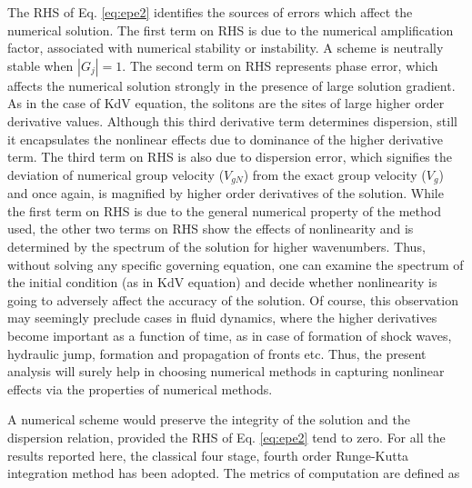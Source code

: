 The RHS of Eq. \eqref{eq:epe2} identifies the sources of errors which affect the numerical solution. The first term on RHS is due to the numerical amplification factor, associated with numerical stability or instability. A scheme is neutrally stable when $|G_j| = 1$. The second term on RHS 
represents phase error, which affects the numerical solution strongly in the presence of large solution gradient. As in the case of KdV equation, 
the solitons are the sites of large higher order derivative values. Although this third derivative term determines dispersion, still it encapsulates 
the nonlinear effects due to dominance of the higher derivative term. The third term on RHS is also due to dispersion error, which signifies the 
deviation of numerical group velocity ($V_{gN}$) from the exact group velocity ($V_g$) and once again, is magnified by higher order derivatives of the solution. While the first term on RHS is due to the general numerical property of the method used, the other two terms on RHS 
show the effects of nonlinearity and is determined by the spectrum of the solution for higher wavenumbers. Thus, without solving any specific 
governing equation, one can examine the spectrum of the initial condition (as in KdV equation) and decide whether nonlinearity is going to adversely 
affect the accuracy of the solution. Of course, this observation may seemingly preclude cases in fluid dynamics, where the higher derivatives become important as a function of time, as in case of formation of shock waves, hydraulic jump, formation and propagation of fronts etc. Thus, the present analysis will surely help in choosing numerical methods in capturing nonlinear effects via the properties of numerical methods.

A numerical scheme would preserve the integrity of the solution and the dispersion relation, provided the RHS of Eq. \eqref{eq:epe2} tend to zero. 
For all the results reported here, the classical four stage, fourth order Runge-Kutta integration method has been adopted. The metrics of computation 
are defined as 

